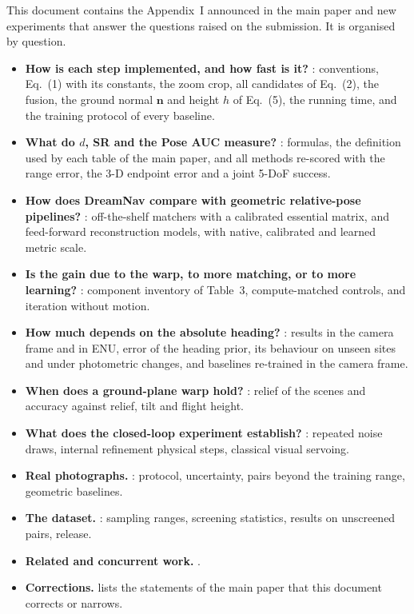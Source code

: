 \noindent This document contains the Appendix~I announced in the main paper and new experiments that answer the questions raised on the submission. It is organised by question.

\begin{itemize}[leftmargin=*,itemsep=1pt,topsep=3pt]
\item \textbf{How is each step implemented, and how fast is it?} : conventions, Eq.~(1) with its constants, the zoom crop, all candidates of Eq.~(2), the fusion, the ground normal $\mathbf{n}$ and height $h$ of Eq.~(5), the running time, and the training protocol of every baseline.
\item \textbf{What do $d$, SR and the Pose AUC measure?} : formulas, the definition used by each table of the main paper, and all methods re-scored with the range error, the 3-D endpoint error and a joint 5-DoF success.
\item \textbf{How does DreamNav compare with geometric relative-pose pipelines?} : off-the-shelf matchers with a calibrated essential matrix, and feed-forward reconstruction models, with native, calibrated and learned metric scale.
\item \textbf{Is the gain due to the warp, to more matching, or to more learning?} : component inventory of Table~3, compute-matched controls, and iteration without motion.
\item \textbf{How much depends on the absolute heading?} : results in the camera frame and in ENU, error of the heading prior, its behaviour on unseen sites and under photometric changes, and baselines re-trained in the camera frame.
\item \textbf{When does a ground-plane warp hold?} : relief of the scenes and accuracy against relief, tilt and flight height.
\item \textbf{What does the closed-loop experiment establish?} : repeated noise draws, internal refinement \vs physical steps, classical visual servoing.
\item \textbf{Real photographs.} : protocol, uncertainty, pairs beyond the training range, geometric baselines.
\item \textbf{The dataset.} : sampling ranges, screening statistics, results on unscreened pairs, release.
\item \textbf{Related and concurrent work.} .
\item \textbf{Corrections.}  lists the statements of the main paper that this document corrects or narrows.
\end{itemize}

